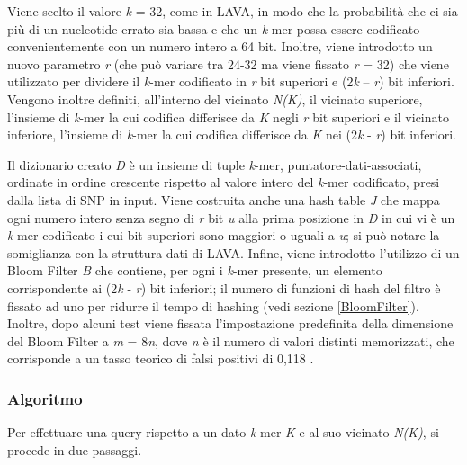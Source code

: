 \documentclass[../main.tex]{subfiles}
\begin{document}
Viene scelto il valore \textit{k} = 32, come in LAVA, in modo che la probabilità che ci sia più di un nucleotide errato sia bassa e che un \textit{k}-mer possa essere codificato convenientemente con un numero intero a 64 bit. Inoltre, viene introdotto un nuovo parametro \textit{r} (che può variare tra 24-32 ma viene fissato \textit{r} = 32) che viene utilizzato per dividere il \textit{k}-mer codificato in \textit{r} bit superiori e (2\textit{k} – \textit{r}) bit inferiori. Vengono inoltre definiti, all'interno del vicinato \textit{N(K)}, il vicinato superiore, l'insieme di \textit{k}-mer la cui codifica differisce da \textit{K} negli \textit{r} bit superiori e il vicinato inferiore, l'insieme di \textit{k}-mer la cui codifica differisce da \textit{K} nei (2\textit{k} - \textit{r}) bit inferiori.

Il dizionario creato \textit{D} è un insieme di tuple \textlangle \textit{k}-mer, puntatore-dati-associati\textrangle, ordinate in ordine crescente rispetto al valore intero del \textit{k}-mer codificato, presi dalla lista di SNP in input. Viene costruita anche una hash table \textit{J} che mappa ogni numero intero senza segno di \textit{r} bit \textit{u} alla prima posizione in \textit{D} in cui vi è un \textit{k}-mer codificato i cui bit superiori sono maggiori o uguali a \textit{u}; si può notare la somiglianza con la struttura dati di LAVA. Infine, viene introdotto l'utilizzo di un Bloom Filter \textit{B} che contiene, per ogni i \textit{k}-mer presente, un elemento corrispondente ai (2\textit{k} - \textit{r}) bit inferiori; il numero di funzioni di hash del filtro è fissato ad uno per ridurre il tempo di hashing (vedi sezione \ref{BloomFilter}). Inoltre, dopo alcuni test viene fissata l'impostazione predefinita della dimensione del Bloom Filter a \textit{m} = 8\textit{n}, dove \textit{n} è il numero di valori distinti memorizzati, che corrisponde a un tasso teorico di falsi positivi di 0,118 \cite{sun-medvedev2018vargeno}.

\subsubsection{Algoritmo}

Per effettuare una query rispetto a un dato \textit{k}-mer \textit{K} e al suo vicinato \textit{N(K)}, si procede in due passaggi. 
\end{document}
